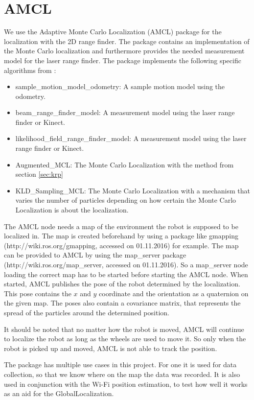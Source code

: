 \section{AMCL}\label{sec:amcl}
We use the Adaptive Monte Carlo Localization (AMCL) package  for the localization with the 2D range finder. The package contains an implementation of the Monte Carlo localization and furthermore provides the needed measurement model for the laser range finder. The package implements the following specific algorithms from \citet{Thrun:2005:PR:1121596}:
\begin{itemize}
\item sample\_motion\_model\_odometry: A sample motion model using the odometry.
\item beam\_range\_finder\_model: A measurement model using the laser range finder or Kinect.
\item likelihood\_field\_range\_finder\_model: A measurement model using the laser range finder or Kinect.
\item Augmented\_MCL: The Monte Carlo Localization with the method from section \ref{sec:krp}
\item KLD\_Sampling\_MCL: The Monte Carlo Localization with a mechanism that varies the number of particles depending on how certain the Monte Carlo Localization is about the localization.
\end{itemize}
The AMCL node needs a map of the environment the robot is supposed to be localized in. The map is created beforehand by using a package like gmapping (http://wiki.ros.org/gmapping, accessed on 01.11.2016) for example. The map can be provided to AMCL by using the map\_server package \\(http://wiki.ros.org/map\_server, accessed on 01.11.2016). So a map\_server node loading the correct map has to be started before starting the AMCL node.
When started, AMCL publishes the pose of the robot determined by the localization. This pose contains the $x$ and $y$ coordinate and the orientation as a quaternion on the given map. The poses also contain a covariance matrix, that represents the spread of the particles around the determined position. 

It should be noted that no matter how the robot is moved, AMCL will continue to localize the robot as long as the wheels are used to move it. So only when the robot is picked up and moved, AMCL is not able to track the position.

The package has multiple use cases in this project. For one it is used for data collection, so that we know where on the map the data was recorded. It is also used in conjunction with the Wi-Fi position estimation, to test how well it works as an aid for the \gls{GlobalLocalization}. 

